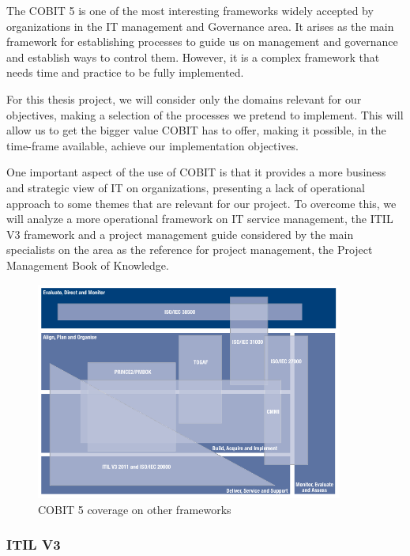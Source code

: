 The COBIT 5 is one of the most interesting frameworks widely accepted by organizations in the IT management and Governance area. It arises as the main framework for establishing processes to guide us on management and governance and establish ways to control them. However, it is a complex framework that needs time and practice to be fully implemented.\par
For this thesis project, we will consider only the domains relevant for our objectives, making a selection of the processes we pretend to implement. This will allow us to get the bigger value COBIT has to offer, making it possible, in the time-frame available, achieve our implementation objectives.\par
One important aspect of the use of COBIT is that it provides a more business and strategic view of IT on organizations, presenting a lack of operational approach to some themes that are relevant for our project. To overcome this, we will analyze a more operational framework on IT service management, the ITIL V3 framework\cite{itilIntro,itilSS,itilST,itilSD,itilSO,itilCSI} and a project management guide considered by the main specialists on the area as the reference for project management, the Project Management Book of Knowledge\cite{pmbok5}.\par

\begin{figure}
\centering
\includegraphics[width=0.9\textwidth]{img/COBITOtherFrameworks.png}
\caption{COBIT 5 coverage on other frameworks}
\end{figure}

\subsubsection{ITIL V3}

